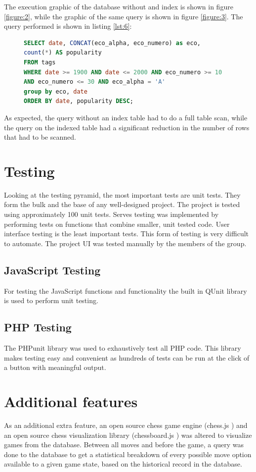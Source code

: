\documentclass{article}
\begin{document}
The execution graphic of the database without and index is shown in figure
\ref{figure:2}, while the graphic of the same query is shown in figure
\ref{figure:3}. The query performed is shown in listing \ref{lst:6}:

\begin{figure}[h]
	\begin{lstlisting}[label={lst:6}, language=sql, frame=single,
	caption=Query used showing explanations of queries]
SELECT date, CONCAT(eco_alpha, eco_numero) as eco,
count(*) AS popularity
FROM tags
WHERE date >= 1900 AND date <= 2000 AND eco_numero >= 10
AND eco_numero <= 30 AND eco_alpha = 'A'
group by eco, date
ORDER BY date, popularity DESC;
	\end{lstlisting}
\end{figure}

As expected, the query without an index table had to do a full table scan,
while the query on the indexed table had a significant reduction in the
number of rows that had to be scanned.

\section{Testing}
Looking at the testing pyramid\cite{test}, the most important tests are unit
tests. They form the bulk and the base of any well-designed project. The
project is tested using approximately 100 unit tests. Serves testing was
implemented by performing tests on functions that combine smaller, unit tested
code. User interface testing is the least important tests. This form of testing
is very difficult to automate. The project UI was tested manually by the
members of the group.
\subsection{JavaScript Testing}
For testing the JavaScript functions and functionality the built
in QUnit library is used to perform unit testing.
\subsection{PHP Testing}
The PHPunit library was used to exhaustively test all PHP code. This library
makes testing easy and convenient as hundreds of tests can be run at the click
of a button with meaningful output.

\section{Additional features}
As an additional extra feature, an open source chess game engine
(chess.js \cite{chess}) and an open source chess visualization library
(chessboard.js \cite{board}) was
altered to visualize games from the database.  Between all moves and before
the game, a query was done to the database to get a statistical breakdown
of every possible move option available to a given game state, based on the
historical record in the database.  
\end{document}
